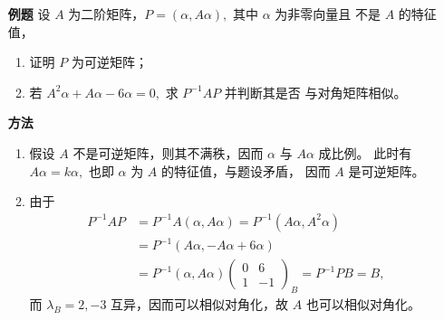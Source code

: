 \begin{itemize}
    \item[\textbf{例题}] 设 $ A $ 为二阶矩阵，$ P = (\alpha,A\alpha), $ 其中 $ \alpha $ 为非零向量且
    不是 $ A $ 的特征值，
    \begin{enumerate}[label = \Roman*.]
        \item 证明 $ P $ 为可逆矩阵；
        \item 若 $ A^2\alpha+A\alpha-6\alpha = 0, $ 求 $ P^{-1}AP $ 并判断其是否
        与对角矩阵相似。
    \end{enumerate}
    \item[\textbf{方法}]
    \begin{enumerate}[label = \Roman*.]
        \item 假设 $ A $ 不是可逆矩阵，则其不满秩，因而 $ \alpha $ 与 $ A\alpha $ 成比例。
        此时有 $ A\alpha = k\alpha, $ 也即 $ \alpha $ 为 $ A $ 的特征值，与题设矛盾，
        因而 $ A $ 是可逆矩阵。
        \item 由于\begin{equation*}
            \begin{aligned}
                P^{-1}AP &= P^{-1}A(\alpha,A\alpha) = P^{-1}(A\alpha,A^2\alpha) \\ 
                &= P^{-1}(A\alpha,-A\alpha+6\alpha) \\&= P^{-1}(\alpha,A\alpha)\begin{pmatrix}
                    0&6\\1&-1
                \end{pmatrix}_{B} = P^{-1}PB = B,
            \end{aligned}
        \end{equation*}
        而 $ \lambda_B = 2,-3 $ 互异，因而可以相似对角化，故 $ A $ 也可以相似对角化。
    \end{enumerate}
\end{itemize}


